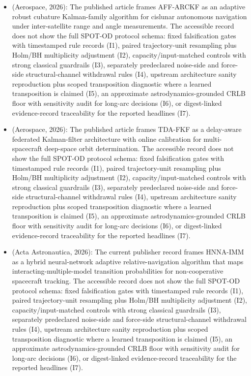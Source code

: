 \begin{itemize}[leftmargin=*]
  \item \cite{xu2026arckf} (Aerospace, 2026): The published article frames AFF-ARCKF as an adaptive robust cubature Kalman-family algorithm for cislunar autonomous navigation under inter-satellite range and angle measurements. The accessible record does not show the full SPOT-OD protocol schema: fixed falsification gates with timestamped rule records (I1), paired trajectory-unit resampling plus Holm/BH multiplicity adjustment (I2), capacity/input-matched controls with strong classical guardrails (I3), separately predeclared noise-side and force-side structural-channel withdrawal rules (I4), upstream architecture sanity reproduction plus scoped transposition diagnostic where a learned transposition is claimed (I5), an approximate astrodynamics-grounded CRLB floor with sensitivity audit for long-arc decisions (I6), or digest-linked evidence-record traceability for the reported headlines (I7).
  \item \cite{li2026delay} (Aerospace, 2026): The published article frames TDA-FKF as a delay-aware federated Kalman-filter architecture with online calibration for multi-spacecraft deep-space orbit determination. The accessible record does not show the full SPOT-OD protocol schema: fixed falsification gates with timestamped rule records (I1), paired trajectory-unit resampling plus Holm/BH multiplicity adjustment (I2), capacity/input-matched controls with strong classical guardrails (I3), separately predeclared noise-side and force-side structural-channel withdrawal rules (I4), upstream architecture sanity reproduction plus scoped transposition diagnostic where a learned transposition is claimed (I5), an approximate astrodynamics-grounded CRLB floor with sensitivity audit for long-arc decisions (I6), or digest-linked evidence-record traceability for the reported headlines (I7).
  \item \cite{zhang2026hnn} (Acta Astronautica, 2026): The current publisher record frames HNNA-IMM as a hybrid neural-network adaptive relative-navigation algorithm that maps interacting-multiple-model transition probabilities for non-cooperative spacecraft tracking. The accessible record does not show the full SPOT-OD protocol schema: fixed falsification gates with timestamped rule records (I1), paired trajectory-unit resampling plus Holm/BH multiplicity adjustment (I2), capacity/input-matched controls with strong classical guardrails (I3), separately predeclared noise-side and force-side structural-channel withdrawal rules (I4), upstream architecture sanity reproduction plus scoped transposition diagnostic where a learned transposition is claimed (I5), an approximate astrodynamics-grounded CRLB floor with sensitivity audit for long-arc decisions (I6), or digest-linked evidence-record traceability for the reported headlines (I7).

\end{itemize}
